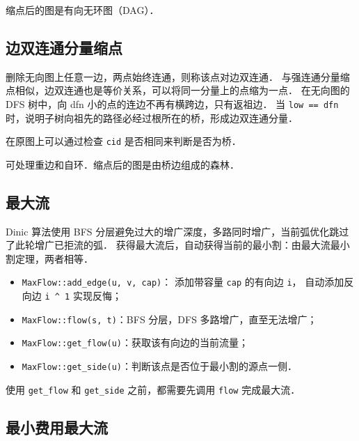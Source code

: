缩点后的图是有向无环图（DAG）．



\subsection{边双连通分量缩点}

删除无向图上任意一边，两点始终连通，则称该点对边双连通．
与强连通分量缩点相似，边双连通也是等价关系，可以将同一分量上的点缩为一点．
在无向图的 DFS 树中，向 dfn 小的点的连边不再有横跨边，只有返祖边．
当 {\tt low == dfn} 时，说明子树向祖先的路径必经过根所在的桥，形成边双连通分量．

在原图上可以通过检查 {\tt cid} 是否相同来判断是否为桥．

可处理重边和自环．缩点后的图是由桥边组成的森林．



\subsection{最大流}

Dinic 算法使用 BFS 分层避免过大的增广深度，多路同时增广，当前弧优化跳过了此轮增广已拒流的弧．
获得最大流后，自动获得当前的最小割：由最大流最小割定理，两者相等．

\begin{itemize}[noitemsep]
    \item {\tt MaxFlow::add\_edge(u, v, cap)}：
        添加带容量 {\tt cap} 的有向边 {\tt i}，
        自动添加反向边 {\tt i \textasciicircum{} 1} 实现反悔；
    \item {\tt MaxFlow::flow(s, t)}：BFS 分层，DFS 多路增广，直至无法增广；
    \item {\tt MaxFlow::get\_flow(u)}：获取该有向边的当前流量；
    \item {\tt MaxFlow::get\_side(u)}：判断该点是否位于最小割的源点一侧．
\end{itemize}

使用 {\tt get\_flow} 和 {\tt get\_side} 之前，都需要先调用 {\tt flow} 完成最大流．



\subsection{最小费用最大流}

